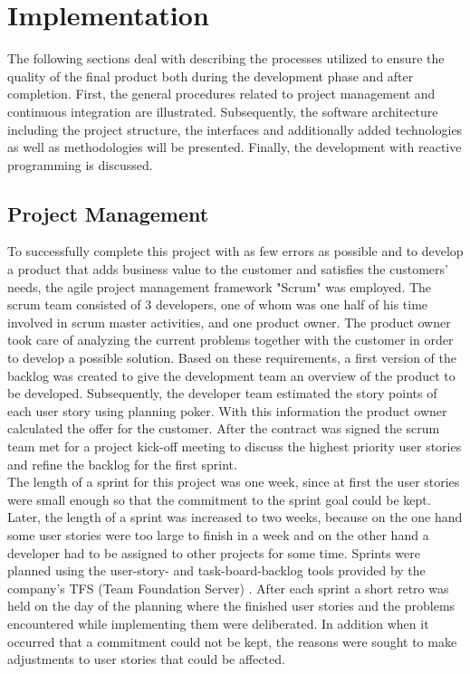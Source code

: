 \documentclass[Bachelor,BIF,english]{twbook}
\begin{document}
\chapter{Implementation}
The following sections deal with describing the processes utilized to ensure the quality of the final product both during the development phase and after completion. First, the general procedures related to project management and continuous integration are illustrated. Subsequently, the software architecture including the project structure, the interfaces and additionally added technologies as well as methodologies will be presented. Finally, the development with reactive programming is discussed.

\section{Project Management}
To successfully complete this project with as few errors as possible and to develop a product that adds business value to the customer and satisfies the customers' needs, the agile project management framework "Scrum" \cite{Scrum} was employed. The scrum team consisted of 3 developers, one of whom was one half of his time involved in scrum master activities, and one product owner. The product owner took care of analyzing the current problems together with the customer in order to develop a possible solution. Based on these requirements, a first version of the backlog was created to give the development team an overview of the product to be developed. Subsequently, the developer team estimated the story points of each user story using planning poker. With this information the product owner calculated the offer for the customer. After the contract was signed the scrum team met for a project kick-off meeting to discuss the highest priority user stories and refine the backlog for the first sprint.
\\[\baselineskip]
The length of a sprint for this project was one week, since at first the user stories were small enough so that the commitment to the sprint goal could be kept. Later, the length of a sprint was increased to two weeks, because on the one hand some user stories were too large to finish in a week and on the other hand a developer had to be assigned to other projects for some time. Sprints were planned using the user-story- and task-board-backlog tools provided by the company's TFS (Team Foundation Server) \cite{TFS}. After each sprint a short retro was held on the day of the planning where the finished user stories and the problems encountered while implementing them were deliberated. In addition when it occurred that a commitment could not be kept, the reasons were sought to make adjustments to user stories that could be affected. 
\end{document}
